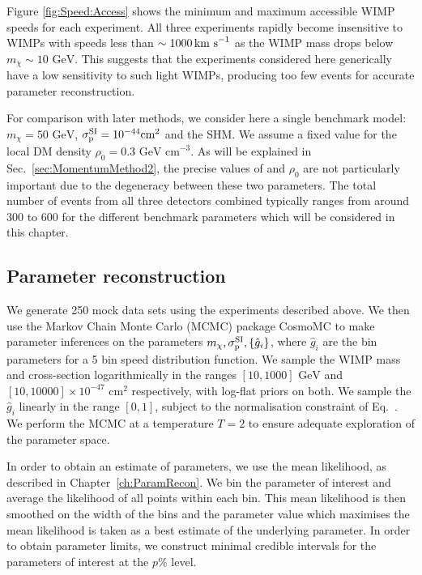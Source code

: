 Figure \ref{fig:Speed:Access} shows the minimum and maximum accessible WIMP speeds for each experiment. All three experiments rapidly become insensitive to WIMPs with speeds less than \(\sim 1000 \,\textrm{km s}^{-1}\) as the WIMP mass drops below \(m_\chi \sim 10 \textrm{ GeV}\). This suggests that the experiments considered here generically have a low sensitivity to such light WIMPs, producing too few events for accurate parameter reconstruction. 

For comparison with later methods, we consider here a single benchmark model: \(m_\chi = 50 \textrm{ GeV}\), $\sigmapsi = 10^{-44} \mathrm{cm}^2$ and the SHM. We assume a fixed value for the local DM density $\rho_0 = 0.3 \textrm{ GeV cm}^{-3}$. As will be explained in Sec.\ \ref{sec:MomentumMethod2}, the precise values of \sigmapsi and \(\rho_0\) are not particularly important due to the degeneracy between these two parameters. The total number of events from all three detectors combined typically ranges from around 300 to 600 for the different benchmark parameters which will be considered in this chapter. 

\subsection{Parameter reconstruction}
We generate 250 mock data sets using the experiments described above. We then use the Markov Chain Monte Carlo (MCMC) package CosmoMC \cite{} to make parameter inferences on the parameters $\mchi, \sigmapsi, \left\{\hat{g}_i\right\}$, where $\hat{g}_i$ are the bin parameters for a 5 bin speed distribution function. We sample the WIMP mass and cross-section logarithmically in the ranges \([10, 1000] \textrm{ GeV}\) and \([10, 10000] \times 10^{-47} \textrm{ cm}^2\) respectively, with log-flat priors on both. We sample the $\hat{g}_i$ linearly in the range $[0,1]$, subject to the normalisation constraint of Eq.~\cite{eq:Speed:ghat}. We perform the MCMC at a temperature $T=2$ to ensure adequate exploration of the parameter space.

In order to obtain an estimate of parameters, we use the mean likelihood, as described in Chapter~\ref{ch:ParamRecon}. We bin the parameter of interest and average the likelihood of all points within each bin. This mean likelihood is then smoothed on the width of the bins and the parameter value which maximises the mean likelihood is taken as a best estimate of the underlying parameter. In order to obtain parameter limits, we construct minimal credible intervals for the parameters of interest at the $p\%$ level. 

